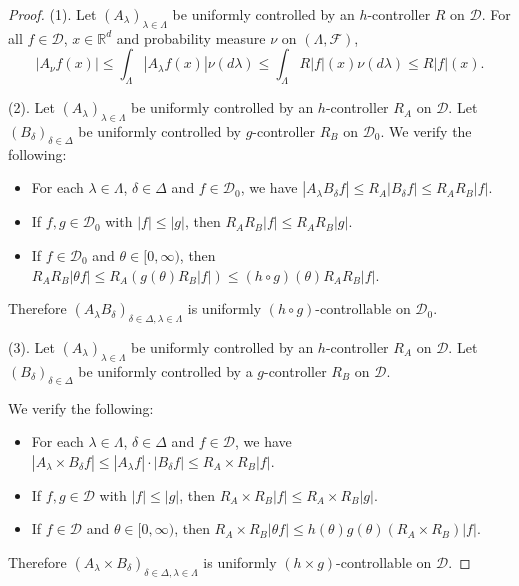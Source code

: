 \documentclass[12pt,a4paper]{amsart}
\theoremstyle{plain}
\theoremstyle{definition}
\numberwithin{equation}{section}
\begin{document}
\begin{proof}
    (1). Let $(A_\lambda)_{\lambda\in\Lambda}$ be uniformly controlled by an $h$-controller $R$ on $\mathcal D$. For all $f \in \mathcal{D}$, $x\in \mathbb R^d$ and  probability measure $\nu$ on $(\Lambda, \mathscr F)$,
\[
   |A_{\nu}f(x)|\leq \int_{\Lambda}|A_{\lambda}f(x)|\nu(d\lambda) \leq \int_{\Lambda}R|f|(x)\nu(d\lambda) \leq R|f|(x).
\]

    (2). Let $(A_\lambda)_{\lambda\in\Lambda}$ be uniformly controlled by  an $h$-controller $R_A$ on $\mathcal D$.
    Let $(B_\delta)_{\delta\in\Delta}$ be uniformly controlled by $g$-controller $R_B$ on $\mathcal D_0$.
    We verify the following:
\begin{itemize}
\item
    For each $\lambda \in \Lambda$, $\delta \in \Delta$ and $f\in \mathcal D_0$, we have $|A_\lambda B_\delta f| \leq R_A |B_\delta f| \leq R_A R_B |f|$.
\item
    If $f,g \in \mathcal D_0$ with $|f|\leq |g|$, then $R_AR_B|f| \leq R_A R_B |g|$.
\item
    If $f \in \mathcal D_0$ and $\theta \in [0,\infty)$, then $R_AR_B|\theta f| \leq R_A(g(\theta) R_B|f|) \leq (h\circ g)(\theta) R_A R_B |f| $.
\end{itemize}
    Therefore $(A_\lambda B_\delta)_{\delta\in \Delta, \lambda \in \Lambda}$ is uniformly $(h \circ g)$-controllable on $\mathcal D_0$.

    (3). Let $(A_\lambda)_{\lambda\in\Lambda}$ be uniformly controlled by an $h$-controller $R_A$ on $\mathcal D$.
    Let $(B_\delta)_{\delta\in\Delta}$ be uniformly controlled by a $g$-controller $R_B$ on $\mathcal D$.

    We verify the following:
\begin{itemize}
\item
    For each $\lambda \in \Lambda$, $\delta \in \Delta$ and $f\in \mathcal D$, we have $|A_\lambda \times B_\delta f| \leq |A_\lambda f| \cdot |B_\delta f| \leq R_A \times R_B |f|$.
\item
    If $f,g \in \mathcal D$ with $|f|\leq |g|$, then $R_A\times R_B|f| \leq R_A\times R_B |g|$.
\item
    If $f \in \mathcal D$ and $\theta \in [0,\infty)$, then $R_A\times R_B|\theta f| \leq h(\theta) g(\theta) (R_A \times R_B) |f| $.
\end{itemize}
    Therefore $(A_\lambda \times B_\delta)_{\delta\in \Delta, \lambda \in \Lambda}$ is uniformly $(h \times g)$-controllable on $\mathcal D$.


\end{proof}
\end{document}
